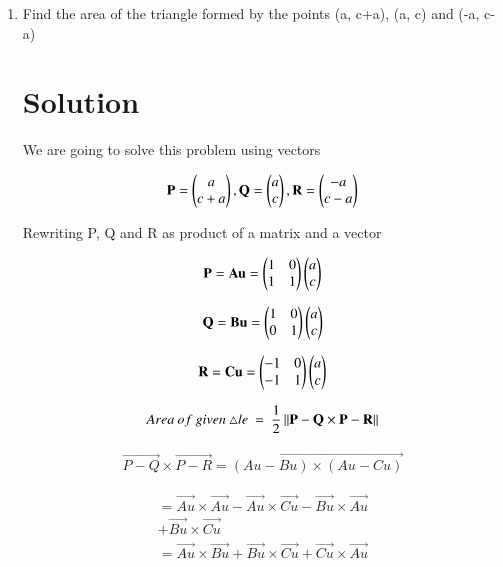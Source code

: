 \documentclass[journal,12pt,twocolumn]{IEEEtran}
\renewcommand\thesection{\arabic{section}}
\begin{document}
\begin{enumerate}[label=\thesection.\arabic*.,ref=\thesection.\theenumi]



\item Find the area of the triangle formed by the points (a, c+a), (a, c) and (-a, c-a)

\section{Solution}
We are going to solve this problem using vectors


\begin{align}
\mathbf{P} = \begin{pmatrix}a\\c+a\end{pmatrix}, \mathbf{Q} =\begin{pmatrix}a\\c\end{pmatrix},
\mathbf{R} =\begin{pmatrix}-a\\c-a\end{pmatrix}
\label{3}
\end{align}

Rewriting P, Q and R as product of a matrix and a vector

\begin{align}
\mathbf{P}=\mathbf{Au}=\begin{pmatrix}1&0\\1&1\end{pmatrix}\begin{pmatrix}a\\c\end{pmatrix}
\end{align}

\begin{align}
\mathbf{Q}=\mathbf{Bu}=\begin{pmatrix}1&0\\0&1\end{pmatrix}\begin{pmatrix}a\\c\end{pmatrix}
\end{align}

\begin{align}
\mathbf{R}=\mathbf{Cu}=\begin{pmatrix}-1&0\\-1&1\end{pmatrix}\begin{pmatrix}a\\c\end{pmatrix}
\end{align}

\begin{align}
Area\:of\:given\:\triangle le\:=\:\frac{1}{2}\norm{\Vec{P-Q}\times  \Vec{P-R}}
\label{1}
\end{align}

\begin{align}
\Vec{P-Q}\times  \Vec{P-R} = \vec{(Au-Bu)\times(Au-Cu)}
\end{align}

\begin{align}
=\vec{Au}\times\vec{Au}-\vec{Au}\times\vec{Cu}-\vec{Bu}\times\vec{Au}\\+\vec{Bu}\times\vec{Cu}
\end{align}
\begin{align}
=\vec{Au}\times\vec{Bu}+\vec{Bu}\times\vec{Cu}+\vec{Cu}\times\vec{Au}
\end{align}



\end{enumerate}
\end{document}

